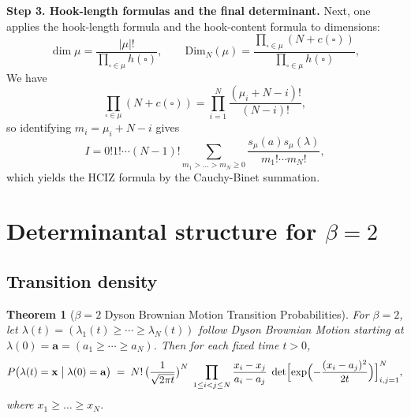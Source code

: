 \documentclass[letterpaper,11pt,oneside,reqno]{book}
\numberwithin{equation}{chapter}  %
\newtheorem{theorem}[proposition]{Theorem}
\theoremstyle{definition}
\begin{document}
\smallskip

\noindent
\textbf{Step 3. Hook-length formulas and the final determinant.}
Next, one applies the hook-length formula
and the hook-content formula to dimensions:
\begin{equation*}
	\dim \mu=\frac{|\mu|!}{\prod_{\square\in\mu} h(\square)},
	\qquad
	\mathrm{Dim}_N(\mu)=\frac{\prod_{\square\in \mu}(N+c(\square))}{\prod_{\square\in\mu} h(\square)},
\end{equation*}
We have
\begin{equation*}
	\prod_{\square\in \mu}(N+c(\square))=\prod_{i=1}^{N}\frac{(\mu_i+N-i)!}{(N-i)!},
\end{equation*}
so identifying $m_i=\mu_i+N-i$ gives
\begin{equation*}
	I=0! 1! \cdots (N-1)!
	\sum_{m_1>\ldots>m_N\ge0 }\frac{s_\mu(a)s_\mu(\lambda)}{m_1!\cdots m_N!},
\end{equation*}
which yields the HCIZ formula by the Cauchy-Binet summation.

\section{Determinantal structure for $\beta=2$}

\subsection{Transition density}

\begin{theorem}[\(\beta=2\) Dyson Brownian Motion Transition Probabilities]
	\label{lecture11:thm:dbm-transition}
For \(\beta=2\), let \(\lambda(t)=(\lambda_1(t)\ge \cdots \ge \lambda_N(t))\) follow Dyson Brownian Motion starting at \(\lambda(0)=\mathbf{a}=(a_1\ge \cdots \ge a_N)\).  Then for each fixed time \(t>0\),
\[
P\bigl(\lambda(t) = \mathbf{x}\;\big|\;\lambda(0)=\mathbf{a}\bigr)
\;=\;
N!\,\bigl(\frac{1}{\sqrt{2\pi t}}\bigr)^{N}
\;\prod_{1\le i<j\le N}\frac{x_i - x_j}{a_i - a_j}
\;\det\Bigl[\exp\Bigl(-\frac{(x_i - a_j)^2}{2t}\Bigr)\Bigr]_{i,j=1}^N,
\]
where \(x_1 \ge \dots \ge x_N\).
\end{theorem}
\end{document}
